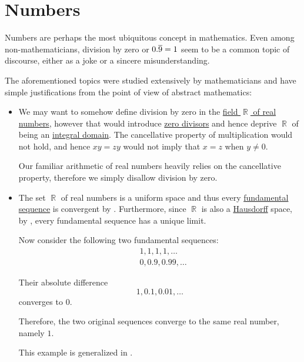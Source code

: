 \chapter{Numbers}\label{ch:numbers}

Numbers are perhaps the most ubiquitous concept in mathematics. Even among non-mathematicians, division by zero or \( 0.\oline{9} = 1 \) seem to be a common topic of discourse, either as a joke or a sincere misunderstanding.

The aforementioned topics were studied extensively by mathematicians and have simple justifications from the point of view of abstract mathematics:
\begin{itemize}
  \item We may want to somehow define division by zero in the \hyperref[def:real_numbers]{field \( \BbbR \) of real numbers}, however that would introduce \hyperref[def:divisibility/zero]{zero divisors} and hence deprive \( \BbbR \) of being an \hyperref[def:integral_domain]{integral domain}. The cancellative property of multiplication would not hold, and hence \( xy = zy \) would not imply that \( x = z \) when \( y \neq 0 \).

  Our familiar arithmetic of real numbers heavily relies on the cancellative property, therefore we simply disallow division by zero.

  \item The set \( \BbbR \) of real numbers is a uniform space and thus every \hyperref[def:fundamental_net]{fundamental sequence} is convergent by . Furthermore, since \( \BbbR \) is also a \hyperref[def:separation_axioms/T2]{Hausdorff} space, by , every fundamental sequence has a unique limit.

  Now consider the following two fundamental sequences:
  \begin{align*}
    &1, 1, 1, 1, \ldots \\
    &0, 0.9, 0.99, \ldots
  \end{align*}

  Their absolute difference
  \begin{equation*}
    1, 0.1, 0.01, \ldots
  \end{equation*}
  converges to \( 0 \).

  Therefore, the two original sequences converge to the same real number, namely \( 1 \).

  This example is generalized in .
\end{itemize}

